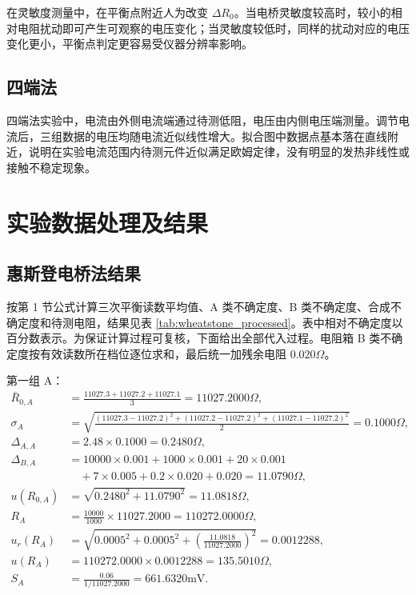 \documentclass[UTF8,a4paper,12pt]{ctexart}
\begin{document}
在灵敏度测量中，在平衡点附近人为改变 $\Delta R_0$。当电桥灵敏度较高时，较小的相对电阻扰动即可产生可观察的电压变化；当灵敏度较低时，同样的扰动对应的电压变化更小，平衡点判定更容易受仪器分辨率影响。

\subsection{四端法}
四端法实验中，电流由外侧电流端通过待测低阻，电压由内侧电压端测量。调节电流后，三组数据的电压均随电流近似线性增大。拟合图中数据点基本落在直线附近，说明在实验电流范围内待测元件近似满足欧姆定律，没有明显的发热非线性或接触不稳定现象。

\section{实验数据处理及结果}

\subsection{惠斯登电桥法结果}
按第 1 节公式计算三次平衡读数平均值、A 类不确定度、B 类不确定度、合成不确定度和待测电阻，结果见表 \ref{tab:wheatstone_processed}。表中相对不确定度以百分数表示。为保证计算过程可复核，下面给出全部代入过程。电阻箱 B 类不确定度按有效读数所在档位逐位求和，最后统一加残余电阻 $0.020\Omega$。

第一组 A：
{\small
\begin{align*}
\bar R_{0,A}&=\frac{11027.3+11027.2+11027.1}{3}=11027.2000\Omega,\\
\sigma_A&=\sqrt{\frac{(11027.3-11027.2)^2+(11027.2-11027.2)^2+(11027.1-11027.2)^2}{2}}=0.1000\Omega,\\
\Delta_{A,A}&=2.48\times0.1000=0.2480\Omega,\\
\Delta_{B,A}&=10000\times0.001+1000\times0.001+20\times0.001\\
&\quad +7\times0.005+0.2\times0.020+0.020=11.0790\Omega,\\
 u(R_{0,A})&=\sqrt{0.2480^2+11.0790^2}=11.0818\Omega,\\
 R_A&=\frac{10000}{1000}\times11027.2000=110272.0000\Omega,\\
 u_r(R_A)&=\sqrt{0.0005^2+0.0005^2+\left(\frac{11.0818}{11027.2000}\right)^2}=0.0012288,\\
 u(R_A)&=110272.0000\times0.0012288=135.5010\Omega,\\
 S_A&=\frac{0.06}{1/11027.2000}=661.6320\mathrm{mV}.
\end{align*}}
\end{document}
